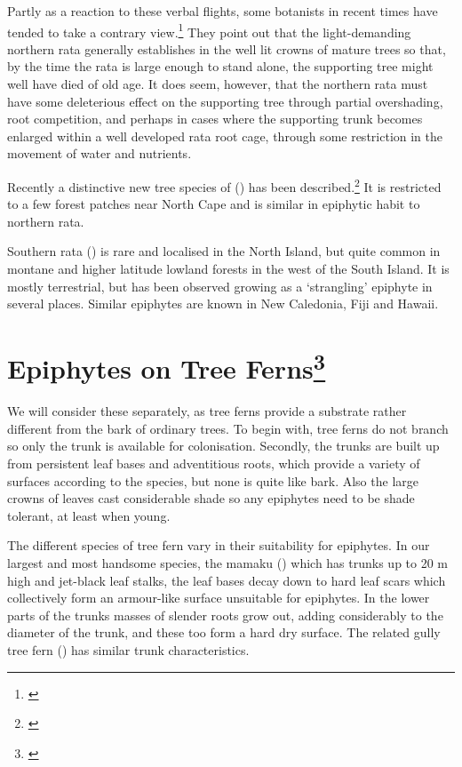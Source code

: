 Partly as a reaction to these verbal flights, some botanists in recent times have tended to take a contrary view.\footnote{\cite{zotov1948rata}}
They point out that the light-demanding northern rata generally establishes in the well lit crowns of mature trees so that, by the time the rata is large enough to stand alone, the supporting tree might well have died of old age.
It does seem, however, that the northern rata must have some deleterious effect on the supporting tree through partial overshading, root competition, and perhaps in cases where the supporting trunk becomes enlarged within a well developed rata root cage, through some restriction in the movement of water and nutrients.

Recently a distinctive new tree species of  () has been described.\footnote{\cite{dawson1985metrosideros}}
It is restricted to a few forest patches near North Cape and is similar in epiphytic habit to northern rata.

Southern rata () is rare and localised in the North Island, but quite common in montane and higher latitude lowland forests in the west of the South Island.
It is mostly terrestrial, but has been observed growing as a `strangling' epiphyte in several places.
Similar  epiphytes are known in New Caledonia, Fiji and Hawai{\okina}i.

\section[Epiphytes on Tree Ferns]{Epiphytes on Tree Ferns\footnote{\cite{pope1924role}}}

We will consider these separately, as tree ferns provide a substrate rather different from the bark of ordinary trees.
To begin with, tree ferns do not branch so only the trunk is available for colonisation.
Secondly, the trunks are built up from persistent leaf bases and adventitious roots, which provide a variety of surfaces according to the species, but none is quite like bark.
Also the large crowns of leaves cast considerable shade so any epiphytes need to be shade tolerant, at least when young.

The different species of tree fern vary in their suitability for epiphytes.
In our largest and most handsome species, the mamaku () which has trunks up to 20 m high and jet-black leaf stalks, the leaf bases decay down to hard leaf scars which collectively form an armour-like surface unsuitable for epiphytes.
In the lower parts of the trunks masses of slender roots grow out, adding considerably to the diameter of the trunk, and these too form a hard dry surface.
The related gully tree fern () has similar trunk characteristics.

